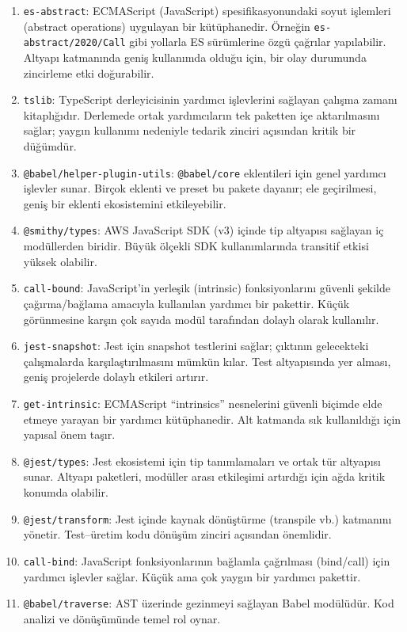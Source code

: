 \documentclass[11pt,a4paper]{article}
\begin{document}
\begin{enumerate}
  \item \texttt{es-abstract}: ECMAScript (JavaScript) spesifikasyonundaki soyut işlemleri (abstract operations) uygulayan bir kütüphanedir. Örneğin \texttt{es-abstract/2020/Call} gibi yollarla ES sürümlerine özgü çağrılar yapılabilir. Altyapı katmanında geniş kullanımda olduğu için, bir olay durumunda zincirleme etki doğurabilir.
  \item \texttt{tslib}: TypeScript derleyicisinin yardımcı işlevlerini sağlayan çalışma zamanı kitaplığıdır. Derlemede ortak yardımcıların tek paketten içe aktarılmasını sağlar; yaygın kullanımı nedeniyle tedarik zinciri açısından kritik bir düğümdür.
  \item \texttt{@babel/helper-plugin-utils}: \texttt{@babel/core} eklentileri için genel yardımcı işlevler sunar. Birçok eklenti ve preset bu pakete dayanır; ele geçirilmesi, geniş bir eklenti ekosistemini etkileyebilir.
  \item \texttt{@smithy/types}: AWS JavaScript SDK (v3) içinde tip altyapısı sağlayan iç modüllerden biridir. Büyük ölçekli SDK kullanımlarında transitif etkisi yüksek olabilir.
  \item \texttt{call-bound}: JavaScript’in yerleşik (intrinsic) fonksiyonlarını güvenli şekilde çağırma/bağlama amacıyla kullanılan yardımcı bir pakettir. Küçük görünmesine karşın çok sayıda modül tarafından dolaylı olarak kullanılır.
  \item \texttt{jest-snapshot}: Jest için snapshot testlerini sağlar; çıktının gelecekteki çalışmalarda karşılaştırılmasını mümkün kılar. Test altyapısında yer alması, geniş projelerde dolaylı etkileri artırır.
  \item \texttt{get-intrinsic}: ECMAScript “intrinsics” nesnelerini güvenli biçimde elde etmeye yarayan bir yardımcı kütüphanedir. Alt katmanda sık kullanıldığı için yapısal önem taşır.
  \item \texttt{@jest/types}: Jest ekosistemi için tip tanımlamaları ve ortak tür altyapısı sunar. Altyapı paketleri, modüller arası etkileşimi artırdığı için ağda kritik konumda olabilir.
  \item \texttt{@jest/transform}: Jest içinde kaynak dönüştürme (transpile vb.) katmanını yönetir. Test–üretim kodu dönüşüm zinciri açısından önemlidir.
  \item \texttt{call-bind}: JavaScript fonksiyonlarının bağlamla çağrılması (bind/call) için yardımcı işlevler sağlar. Küçük ama çok yaygın bir yardımcı pakettir.
  \item \texttt{@babel/traverse}: AST üzerinde gezinmeyi sağlayan Babel modülüdür. Kod analizi ve dönüşümünde temel rol oynar.

\end{enumerate}
\end{document}
